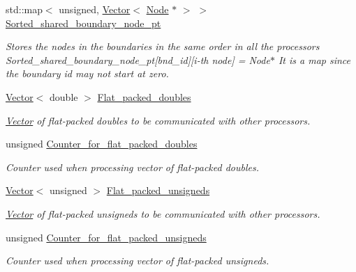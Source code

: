 \begin{DoxyCompactItemize}
std\+::map$<$ unsigned, \hyperlink{classoomph_1_1Vector}{Vector}$<$ \hyperlink{classoomph_1_1Node}{Node} $\ast$ $>$ $>$ \hyperlink{classoomph_1_1RefineableTriangleMesh_ab22bada72171b4403ce2424a3f36b0d3}{Sorted\+\_\+shared\+\_\+boundary\+\_\+node\+\_\+pt}
\begin{DoxyCompactList}\small\item\em Stores the nodes in the boundaries in the same order in all the processors Sorted\+\_\+shared\+\_\+boundary\+\_\+node\+\_\+pt\mbox{[}bnd\+\_\+id\mbox{]}\mbox{[}i-\/th node\mbox{]} = Node$\ast$ It is a map since the boundary id may not start at zero. \end{DoxyCompactList}\item 
\hyperlink{classoomph_1_1Vector}{Vector}$<$ double $>$ \hyperlink{classoomph_1_1RefineableTriangleMesh_afd370f91590e5f7e21194d58c00b6ba0}{Flat\+\_\+packed\+\_\+doubles}
\begin{DoxyCompactList}\small\item\em \hyperlink{classoomph_1_1Vector}{Vector} of flat-\/packed doubles to be communicated with other processors. \end{DoxyCompactList}\item 
unsigned \hyperlink{classoomph_1_1RefineableTriangleMesh_a5fc09234e6d14789d597b40fd66b3d4f}{Counter\+\_\+for\+\_\+flat\+\_\+packed\+\_\+doubles}
\begin{DoxyCompactList}\small\item\em Counter used when processing vector of flat-\/packed doubles. \end{DoxyCompactList}\item 
\hyperlink{classoomph_1_1Vector}{Vector}$<$ unsigned $>$ \hyperlink{classoomph_1_1RefineableTriangleMesh_a162fd7e805e4899cf4590cb5245849f2}{Flat\+\_\+packed\+\_\+unsigneds}
\begin{DoxyCompactList}\small\item\em \hyperlink{classoomph_1_1Vector}{Vector} of flat-\/packed unsigneds to be communicated with other processors. \end{DoxyCompactList}\item 
unsigned \hyperlink{classoomph_1_1RefineableTriangleMesh_a5bb1b8a504779c77968538fe612a157d}{Counter\+\_\+for\+\_\+flat\+\_\+packed\+\_\+unsigneds}
\begin{DoxyCompactList}\small\item\em Counter used when processing vector of flat-\/packed unsigneds. \end{DoxyCompactList}\item 

\end{DoxyCompactItemize}
